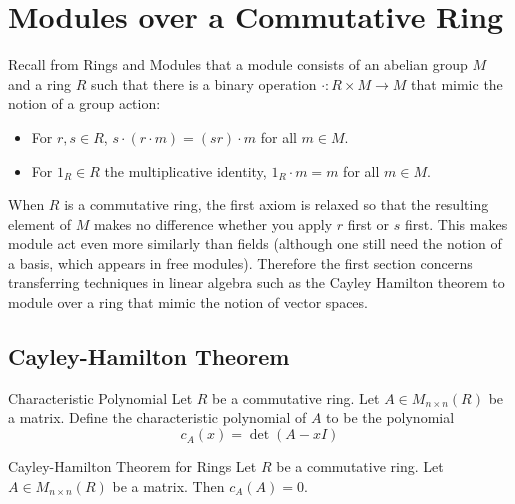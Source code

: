 \documentclass[a4paper]{article}
\begin{document}
\pagebreak
\section{Modules over a Commutative Ring}
Recall from Rings and Modules that a module consists of an abelian group $M$ and a ring $R$ such that there is a binary operation $\cdot:R\times M\to M$ that mimic the notion of a group action: 
\begin{itemize}
\item For $r,s\in R$, $s\cdot(r\cdot m)=(sr)\cdot m$ for all $m\in M$. 
\item For $1_R\in R$ the multiplicative identity, $1_R\cdot m=m$ for all $m\in M$. 
\end{itemize}

When $R$ is a commutative ring, the first axiom is relaxed so that the resulting element of $M$ makes no difference whether you apply $r$ first or $s$ first. This makes module act even more similarly than fields (although one still need the notion of a basis, which appears in free modules). Therefore the first section concerns transferring techniques in linear algebra such as the Cayley Hamilton theorem to module over a ring that mimic the notion of vector spaces. 

\subsection{Cayley-Hamilton Theorem}
\begin{defn}{Characteristic Polynomial}{} Let $R$ be a commutative ring. Let $A\in M_{n\times n}(R)$ be a matrix. Define the characteristic polynomial of $A$ to be the polynomial $$c_A(x)=\det(A-xI)$$
\end{defn}

\begin{thm}{Cayley-Hamilton Theorem for Rings}{} Let $R$ be a commutative ring. Let $A\in M_{n\times n}(R)$ be a matrix. Then $c_A(A)=0$. 
\end{thm}
\end{document}
